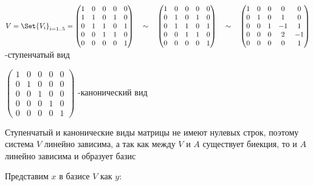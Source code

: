 \begin{enumerate}
    $\displaystyle V = \Set{V_i}_{i = 1..5} =
    \begin{pmatrix}1 & 0 & 0 & 0 & 0 \\ 1 & 1 & 0 & 1 & 0 \\ 0 & 1 & 1 & 0 & 1 \\ 0 & 0 & 1 & 1 & 0 \\ 0 & 0 & 0 & 0 & 1\end{pmatrix}
    \quad\sim\quad
    \begin{pmatrix}1 & 0 & 0 & 0 & 0 \\ 0 & 1 & 0 & 1 & 0 \\ 0 & 1 & 1 & 0 & 1 \\ 0 & 0 & 1 & 1 & 0 \\ 0 & 0 & 0 & 0 & 1\end{pmatrix}
    \quad\sim\quad
    \begin{pmatrix}1 & 0 & 0 & 0 & 0 \\ 0 & 1 & 0 & 1 & 0 \\ 0 & 0 & 1 & -1 & 1 \\ 0 & 0 & 0 & 2 & -1 \\ 0 & 0 & 0 & 0 & 1\end{pmatrix}$
    \quad-\quad ступенчатый вид

    $\begin{pmatrix}1 & 0 & 0 & 0 & 0 \\ 0 & 1 & 0 & 0 & 0 \\ 0 & 0 & 1 & 0 & 0 \\ 0 & 0 & 0 & 1 & 0 \\ 0 & 0 & 0 & 0 & 1\end{pmatrix}$
    \quad-\quad канонический вид

    Ступенчатый и канонические виды матрицы не имеют нулевых строк, поэтому система $V$ линейно зависима,
    а так как между $V$ и $A$ существует биекция, то и $A$ линейно зависима и образует базис

    Представим $x$ в базисе $V$ как $y$:


\end{enumerate}
